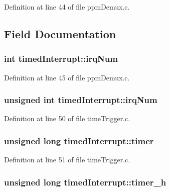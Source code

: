 Definition at line 44 of file ppm\+Demux.\+c.



\subsection{Field Documentation}
\hypertarget{structtimedInterrupt_a7e3743a35e009262953f43a25e65b321_a7e3743a35e009262953f43a25e65b321}{
\subsubsection[{irq\+Num}]{\setlength{\rightskip}{0pt plus 5cm}int timed\+Interrupt\+::irq\+Num}}\label{structtimedInterrupt_a7e3743a35e009262953f43a25e65b321_a7e3743a35e009262953f43a25e65b321}


Definition at line 45 of file ppm\+Demux.\+c.

\hypertarget{structtimedInterrupt_afe863922719ad198b647157e5c0ab5f2_afe863922719ad198b647157e5c0ab5f2}{
\subsubsection[{irq\+Num}]{\setlength{\rightskip}{0pt plus 5cm}unsigned int timed\+Interrupt\+::irq\+Num}}\label{structtimedInterrupt_afe863922719ad198b647157e5c0ab5f2_afe863922719ad198b647157e5c0ab5f2}


Definition at line 50 of file time\+Trigger.\+c.

\hypertarget{structtimedInterrupt_a22ab02fd7b04fa04d1c1dea800bac62e_a22ab02fd7b04fa04d1c1dea800bac62e}{
\subsubsection[{timer}]{\setlength{\rightskip}{0pt plus 5cm}unsigned long timed\+Interrupt\+::timer}}\label{structtimedInterrupt_a22ab02fd7b04fa04d1c1dea800bac62e_a22ab02fd7b04fa04d1c1dea800bac62e}


Definition at line 51 of file time\+Trigger.\+c.

\hypertarget{structtimedInterrupt_ae0c686eadc5df51274fae964275a1814_ae0c686eadc5df51274fae964275a1814}{
\subsubsection[{timer\+\_\+h}]{\setlength{\rightskip}{0pt plus 5cm}unsigned long timed\+Interrupt\+::timer\+\_\+h}}\label{structtimedInterrupt_ae0c686eadc5df51274fae964275a1814_ae0c686eadc5df51274fae964275a1814}


